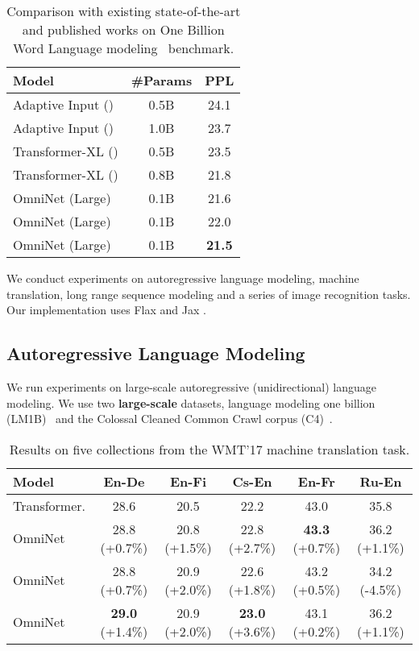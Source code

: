 \documentclass{article}
\begin{document}
\begin{table}[t]
    \centering
    \caption{Comparison with existing state-of-the-art and published works on One Billion Word Language modeling~\citep{chelba2013one} benchmark.}
    \begin{tabular}{l|cc}
    \toprule
        Model & \#Params &PPL  \\
        \midrule
        Adaptive Input (\citeauthor{baevski2018adaptive}) & 0.5B&24.1 \\
        Adaptive Input (\citeauthor{baevski2018adaptive}) & 1.0B &23.7 \\ 
         Transformer-XL (\citeauthor{dai2019transformer}) &0.5B &23.5\\
         Transformer-XL (\citeauthor{dai2019transformer}) & 0.8B &21.8\\ 
         \midrule
         OmniNet (Large) & 0.1B & 21.6 \\
         OmniNet (Large) & 0.1B & 22.0\\ 
         OmniNet (Large)  & 0.1B & \textbf{21.5}\\ 
         \bottomrule
    \end{tabular}
    \label{tab:lmsota}
    \vspace{-15pt}
\end{table}
We conduct experiments on autoregressive language modeling, machine translation, long range sequence modeling and a series of image recognition tasks. Our implementation uses Flax \citep{flax2020github} and Jax \citep{jax2018github}.



\subsection{Autoregressive Language Modeling}
We run experiments on large-scale autoregressive (unidirectional) language modeling. We use two \textbf{large-scale} datasets, language modeling one billion (LM1B)~\citep{chelba2013one} and the Colossal Cleaned Common Crawl corpus (C4)~\citep{raffel2019exploring}. 

\begin{table*}[t]
    \vspace{-12pt}
    \centering
    \caption{Results on five collections from the WMT'17 machine translation task.}
    \begin{tabular}{l|ccccc}
    \toprule
    Model & En-De & En-Fi & Cs-En & En-Fr & Ru-En  \\
    \midrule
      Transformer.   & 28.6 &  20.5 & 22.2 & 43.0 & 35.8 \\
\midrule
         OmniNet  & 28.8 (+0.7\%)& 20.8 (+1.5\%) &  22.8 (+2.7\%)& \textbf{43.3} (+0.7\%) & 36.2 (+1.1\%) \\ 
         OmniNet  & 28.8 (+0.7\%) &20.9 (+2.0\%)  & 22.6 (+1.8\%) & 43.2 (+0.5\%)& 34.2 (-4.5\%)\\ 
OmniNet &\textbf{29.0} (+1.4\%) & 20.9 (+2.0\%) & \textbf{23.0} (+3.6\%) & 43.1 (+0.2\%) &36.2 (+1.1\%) \\
         \bottomrule
    \end{tabular}
    \label{tab:wmt17}
    \vspace{-17pt}
\end{table*}
\end{document}
